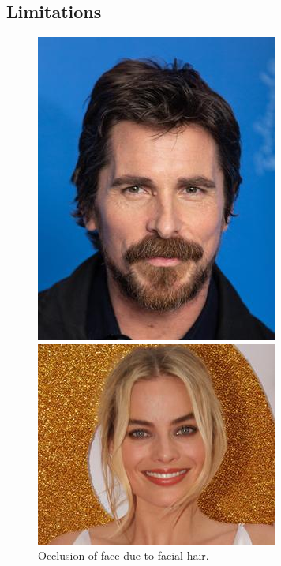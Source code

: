 \documentclass{l4proj}
\begin{document}
\subsection{Limitations}
\begin{figure}[h!]
  \centering
  \begin{minipage}{0.32\textwidth}
    \includegraphics[width=\textwidth]{images/13_m_r.jpg}
    \caption{Occlusion of face due to facial hair.}
    \label{facehair}
  \end{minipage}
  \hfill
    \begin{minipage}{0.32\textwidth}
    \includegraphics[width=\textwidth]{images/45_f_r.jpg}

\end{minipage}
\end{figure}
\end{document}
